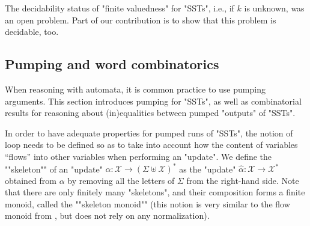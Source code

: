 \documentclass{theoretics}
\newcommand{\var}{\mathcal{X}}
\newcommand{\alp}{\Sigma}
\begin{document}
The decidability status of "finite valuedness" for "SSTs", 
i.e., if $k$ is unknown, was an open problem.
Part of our contribution is to show that this problem is  decidable, too.





\subsection{Pumping and word combinatorics}\label{subsec:pumping}

When reasoning with automata, it is common practice
to use pumping arguments.
This section introduces pumping for "SSTs", as well 
as combinatorial results for reasoning about (in)equalities 
between pumped "outputs" of "SSTs".



In order to have adequate properties for pumped runs of "SSTs",
the notion of loop needs to be defined so as to take into 
account how the content of variables ``flows'' into 
other variables when performing an "update". 
\AP 
We define the ""skeleton"" of an "update" $\alpha: \var\rightarrow (\alp \uplus \var)^*$
as the "update" $\hat\alpha: \var \rightarrow \var^*$ obtained from $\alpha$
by removing all the letters of $\Sigma$ from the right-hand side.
\AP
Note that there are only finitely many "skeletons", and 
their composition forms a finite monoid, called the
""skeleton monoid""
(this notion is very similar to the flow monoid from \cite{equivalence-finite-valued},
 but does not rely on any normalization).
\end{document}
